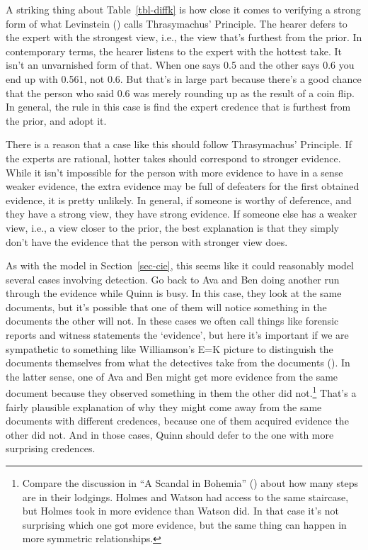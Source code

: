 \documentclass[
  11pt,
  letterpaper,
  DIV=11,
  numbers=noendperiod,
  twoside]{scrartcl}
\begin{document}
A striking thing about Table~\ref{tbl-diffk} is how close it comes to
verifying a strong form of what Levinstein
() calls Thrasymachus' Principle. The
hearer defers to the expert with the strongest view, i.e., the view
that's furthest from the prior. In contemporary terms, the hearer
listens to the expert with the hottest take. It isn't an unvarnished
form of that. When one says 0.5 and the other says 0.6 you end up with
0.561, not 0.6. But that's in large part because there's a good chance
that the person who said 0.6 was merely rounding up as the result of a
coin flip. In general, the rule in this case is find the expert credence
that is furthest from the prior, and adopt it.

There is a reason that a case like this should follow Thrasymachus'
Principle. If the experts are rational, hotter takes should correspond
to stronger evidence. While it isn't impossible for the person with more
evidence to have in a sense weaker evidence, the extra evidence may be
full of defeaters for the first obtained evidence, it is pretty
unlikely. In general, if someone is worthy of deference, and they have a
strong view, they have strong evidence. If someone else has a weaker
view, i.e., a view closer to the prior, the best explanation is that
they simply don't have the evidence that the person with stronger view
does.

As with the model in Section~\ref{sec-cie}, this seems like it could
reasonably model several cases involving detection. Go back to Ava and
Ben doing another run through the evidence while Quinn is busy. In this
case, they look at the same documents, but it's possible that one of
them will notice something in the documents the other will not. In these
cases we often call things like forensic reports and witness statements
the `evidence', but here it's important if we are sympathetic to
something like Williamson's E=K picture to distinguish the documents
themselves from what the detectives take from the documents
(). In the latter sense,
one of Ava and Ben might get more evidence from the same document
because they observed something in them the other did not.\footnote{Compare
  the discussion in ``A Scandal in Bohemia''
  () about
  how many steps are in their lodgings. Holmes and Watson had access to
  the same staircase, but Holmes took in more evidence than Watson did.
  In that case it's not surprising which one got more evidence, but the
  same thing can happen in more symmetric relationships.} That's a
fairly plausible explanation of why they might come away from the same
documents with different credences, because one of them acquired
evidence the other did not. And in those cases, Quinn should defer to
the one with more surprising credences.
\end{document}
